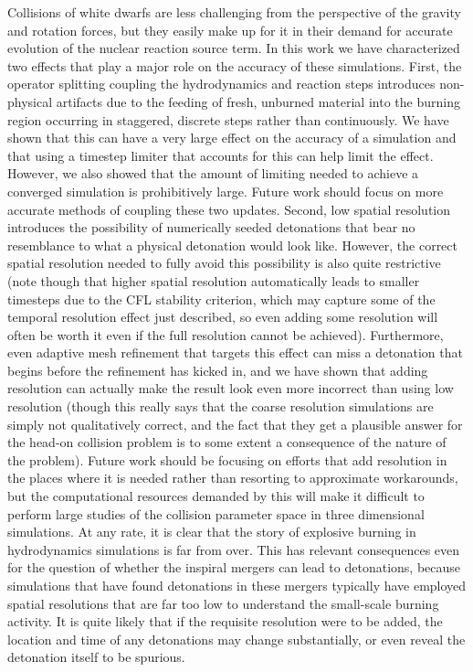 \documentclass[12pt]{article}
\begin{document}
Collisions of white dwarfs are less challenging from the perspective of the gravity and
rotation forces, but they easily make up for it in their demand for accurate evolution of
the nuclear reaction source term. In this work we have characterized two effects that
play a major role on the accuracy of these simulations. First, the operator splitting
coupling the hydrodynamics and reaction steps introduces non-physical artifacts due to
the feeding of fresh, unburned material into the burning region occurring in staggered,
discrete steps rather than continuously. We have shown that this can have a very large
effect on the accuracy of a simulation and that using a timestep limiter that accounts
for this can help limit the effect. However, we also showed that the amount of limiting
needed to achieve a converged simulation is prohibitively large. Future work should focus
on more accurate methods of coupling these two updates. Second, low spatial resolution
introduces the possibility of numerically seeded detonations that bear no resemblance
to what a physical detonation would look like. However, the correct spatial resolution needed
to fully avoid this possibility is also quite restrictive (note though that higher
spatial resolution automatically leads to smaller timesteps due to the CFL stability
criterion, which may capture some of the temporal resolution effect just described, so
even adding some resolution will often be worth it even if the full resolution cannot
be achieved). Furthermore, even adaptive mesh refinement that targets this effect
can miss a detonation that begins before the refinement has kicked in, and we have shown
that adding resolution can actually make the result look even more incorrect than
using low resolution (though this really says that the coarse resolution simulations are
simply not qualitatively correct, and the fact that they get a plausible answer for
the head-on collision problem is to some extent a consequence of the nature of the problem).
Future work should be focusing on efforts that add resolution in the places where it is
needed rather than resorting to approximate workarounds, but the computational resources
demanded by this will make it difficult to perform large studies of the collision
parameter space in three dimensional simulations. At any rate, it is clear that the story
of explosive burning in hydrodynamics simulations is far from over. This has relevant
consequences even for the question of whether the inspiral mergers can lead to detonations,
because simulations that have found detonations in these mergers typically have employed
spatial resolutions that are far too low to understand the small-scale burning activity.
It is quite likely that if the requisite resolution were to be added, the location and
time of any detonations may change substantially, or even reveal the detonation itself
to be spurious.
\end{document}
